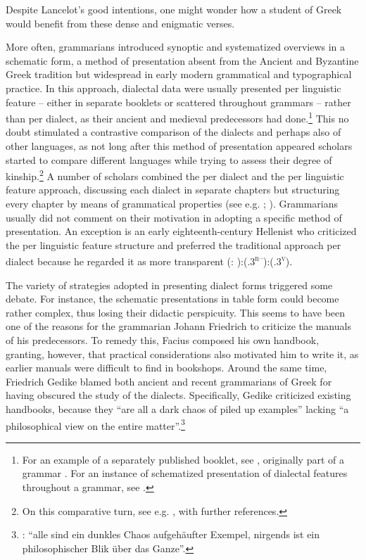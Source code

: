 Despite Lancelot’s good intentions, one might wonder how a student of Greek would benefit from these dense and enigmatic verses.

More often, grammarians introduced synoptic and systematized overviews in a schematic form, a method of presentation absent from the Ancient and Byzantine Greek tradition but widespread in early modern grammatical and typographical practice. In this approach, dialectal data were usually presented per linguistic feature – either in separate booklets or scattered throughout grammars – rather than per dialect, as their ancient and medieval predecessors had done.\footnote{For an example of a separately published booklet, see \citet{Amerot1530}, originally part of a grammar \citep{Amerot1520}. For an instance of schematized presentation of dialectal features throughout a grammar, see \citet{Gretser1593}.} This no doubt stimulated a contrastive comparison of the dialects and perhaps also of other languages, as not long after this method of presentation appeared scholars started to compare different languages while trying to assess their degree of kinship.\footnote{On this comparative turn, see e.g. \citet{Considine2010b}, with further references.} A number of scholars combined the per dialect and the per linguistic feature approach, discussing each dialect in separate chapters but structuring every chapter by means of grammatical properties (see e.g. \citealt{Zwinger1605}; \citealt{Merigon1621}). Grammarians usually did not comment on their motivation in adopting a specific method of presentation. An exception is an early eighteenth-century Hellenist who criticized the per linguistic feature structure and preferred the traditional approach per dialect because he regarded it as more transparent (\citealt{Heupel1712}: ):(.3\textsc{\textsuperscript{r–}}):(.3\textsc{\textsuperscript{v}}).

The variety of strategies adopted in presenting dialect forms triggered some debate. For instance, the schematic presentations in table form could become rather complex, thus losing their didactic perspicuity. This seems to have been one of the reasons for the grammarian Johann Friedrich \citet[\textsc{viii}]{Facius1782} to criticize the manuals of his predecessors. To remedy this, Facius composed his own handbook, granting, however, that practical considerations also motivated him to write it, as earlier manuals were difficult to find in bookshops. Around the same time, Friedrich Gedike blamed both ancient and recent grammarians of Greek for having obscured the study of the dialects. Specifically, Gedike criticized existing handbooks, because they “are all a dark chaos of piled up examples” lacking “a philosophical view on the entire matter”.\footnote{\citet[4]{Gedike1782}: “alle sind ein dunkles Chaos aufgehäufter Exempel, nirgends ist ein philosophischer Blik über das Ganze”.}

